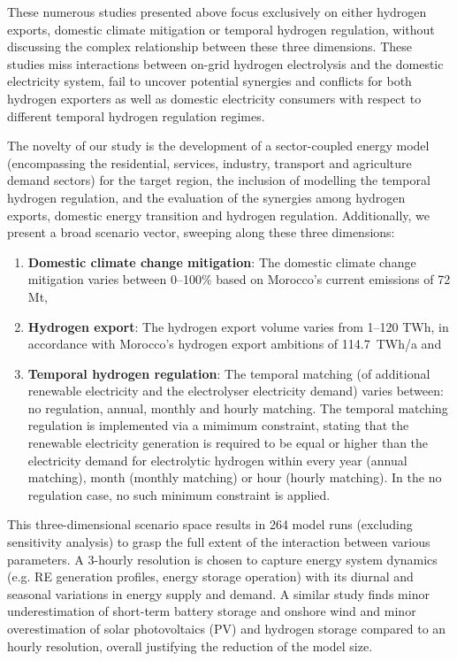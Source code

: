 These numerous studies presented above focus exclusively on either hydrogen exports, domestic climate mitigation or temporal hydrogen regulation, without discussing the complex relationship between these three dimensions. These studies miss interactions between on-grid hydrogen electrolysis and the domestic electricity system, fail to uncover potential synergies and conflicts for both hydrogen exporters as well as domestic electricity consumers with respect to different temporal hydrogen regulation regimes.


The novelty of our study is the development of a sector-coupled energy model (encompassing the residential, services, industry, transport and agriculture demand sectors) for the target region, the inclusion of modelling the temporal hydrogen regulation, and the evaluation of the synergies among hydrogen exports, domestic energy transition and hydrogen regulation.
Additionally, we present a broad scenario vector, sweeping along these three dimensions:
\begin{enumerate}
    \item \textbf{Domestic climate change mitigation}: The domestic climate change mitigation varies between 0--100\% based on Morocco's current emissions of 72 Mt\coe,
    \item \textbf{Hydrogen export}: The hydrogen export volume varies from 1--120 TWh, in accordance with Morocco's hydrogen export ambitions of 114.7~TWh/a and
    \item \textbf{Temporal hydrogen regulation}: The temporal matching (of additional renewable electricity and the electrolyser electricity demand) varies between: no regulation, annual, monthly and hourly matching. The temporal matching regulation is implemented via a mimimum constraint, stating that the renewable electricity generation is required to be equal or higher than the electricity demand for electrolytic hydrogen within every year (annual matching), month (monthly matching) or hour (hourly matching). In the no regulation case, no such minimum constraint is applied.
\end{enumerate}
This three-dimensional scenario space results in 264 model runs (excluding sensitivity analysis) to grasp the full extent of the interaction between various parameters.
A 3-hourly resolution is chosen to capture energy system dynamics (e.g. RE generation profiles, energy storage operation) with its diurnal and seasonal variations in energy supply and demand. A similar study \cite{Neumann2022} finds minor underestimation of short-term battery storage and onshore wind and minor overestimation of solar photovoltaics (PV) and hydrogen storage compared to an hourly resolution, overall justifying the reduction of the model size. 
